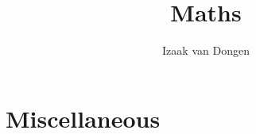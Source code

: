 \documentclass[a4paper,11pt]{article}
\title{Maths}
\author{Izaak van Dongen}
\newtheorem{thm}{Theorem}
\begin{document}
    \maketitle\thispagestyle{empty} %
    \tableofcontents


    \section{Miscellaneous}

%
\end{document}
